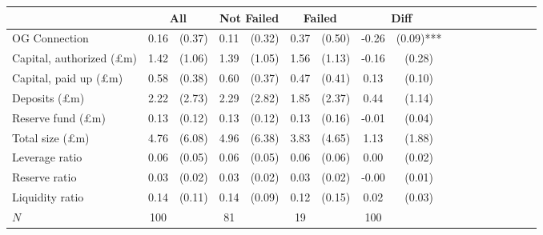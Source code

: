 {
\def\sym#1{\ifmmode^{#1}\else\(^{#1}\)\fi}
\begin{tabular}{l*{4}{cccc}}
\toprule
          &\multicolumn{2}{c}{All}&\multicolumn{2}{c}{Not Failed}&\multicolumn{2}{c}{Failed}&\multicolumn{2}{c}{Diff}\\
\midrule
OG Connection&     0.16&   (0.37)&     0.11&   (0.32)&     0.37&   (0.50)&    -0.26&   (0.09)***\\\hline
Capital, authorized (\pounds m)&     1.42&   (1.06)&     1.39&   (1.05)&     1.56&   (1.13)&    -0.16&   (0.28)   \\
Capital, paid up (\pounds m)&     0.58&   (0.38)&     0.60&   (0.37)&     0.47&   (0.41)&     0.13&   (0.10)   \\
Deposits (\pounds m)&     2.22&   (2.73)&     2.29&   (2.82)&     1.85&   (2.37)&     0.44&   (1.14)   \\
Reserve fund (\pounds m)&     0.13&   (0.12)&     0.13&   (0.12)&     0.13&   (0.16)&    -0.01&   (0.04)   \\
Total size (\pounds m)&     4.76&   (6.08)&     4.96&   (6.38)&     3.83&   (4.65)&     1.13&   (1.88)   \\
Leverage ratio&     0.06&   (0.05)&     0.06&   (0.05)&     0.06&   (0.06)&     0.00&   (0.02)   \\
Reserve ratio&     0.03&   (0.02)&     0.03&   (0.02)&     0.03&   (0.02)&    -0.00&   (0.01)   \\
Liquidity ratio&     0.14&   (0.11)&     0.14&   (0.09)&     0.12&   (0.15)&     0.02&   (0.03)   \\
\midrule
\(N\)     &      100&         &       81&         &       19&         &      100&            \\
\bottomrule
\end{tabular}
}
